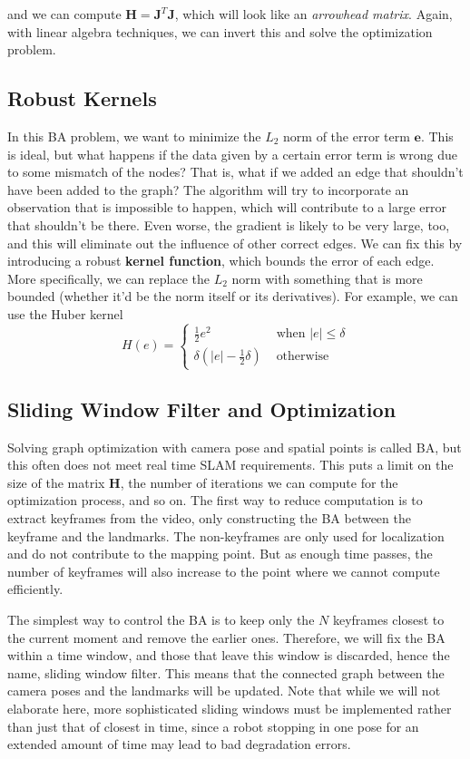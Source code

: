 \documentclass{article}
\theoremstyle{definition}
\theoremstyle{remark}
\theoremstyle{definition}
\begin{document}
and we can compute $\mathbf{H} = \mathbf{J}^T \mathbf{J}$, which will look like an \textit{arrowhead matrix}. Again, with linear algebra techniques, we can invert this and solve the optimization problem. 

\subsection{Robust Kernels}

In this BA problem, we want to minimize the $L_2$ norm of the error term $\mathbf{e}$. This is ideal, but what happens if the data given by a certain error term is wrong due to some mismatch of the nodes? That is, what if we added an edge that shouldn't have been added to the graph? The algorithm will try to incorporate an observation that is impossible to happen, which will contribute to a large error that shouldn't be there. Even worse, the gradient is likely to be very large, too, and this will eliminate out the influence of other correct edges. We can fix this by introducing a robust \textbf{kernel function}, which bounds the error of each edge. More specifically, we can replace the $L_2$ norm with something that is more bounded (whether it'd be the norm itself or its derivatives). For example, we can use the Huber kernel 
\[H(e) = \begin{cases} \frac{1}{2} e^2 & \text{ when } |e| \leq \delta \\ \delta (|e| - \frac{1}{2} \delta) & \text{ otherwise } \end{cases}\]

\subsection{Sliding Window Filter and Optimization}

Solving graph optimization with camera pose and spatial points is called BA, but this often does not meet real time SLAM requirements. This puts a limit on the size of the matrix $\mathbf{H}$, the number of iterations we can compute for the optimization process, and so on. The first way to reduce computation is to extract keyframes from the video, only constructing the BA between the keyframe and the landmarks. The non-keyframes are only used for localization and do not contribute to the mapping point. But as enough time passes, the number of keyframes will also increase to the point where we cannot compute efficiently. 

The simplest way to control the BA is to keep only the $N$ keyframes closest to the current moment and remove the earlier ones. Therefore, we will fix the BA within a time window, and those that leave this window is discarded, hence the name, sliding window filter. This means that the connected graph between the camera poses and the landmarks will be updated. Note that while we will not elaborate here, more sophisticated sliding windows must be implemented rather than just that of closest in time, since a robot stopping in one pose for an extended amount of time may lead to bad degradation errors. 
\end{document}
